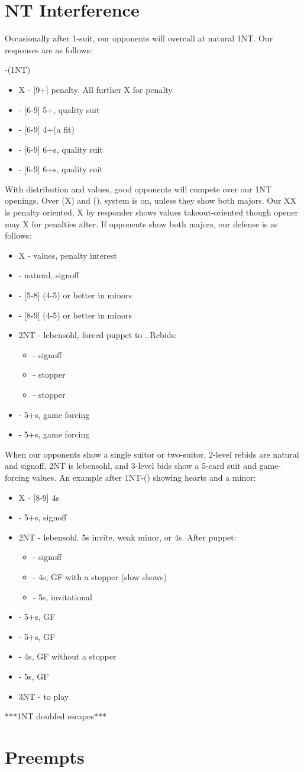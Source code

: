 \documentclass[12pt]{report}
\newcommand{\q}[1]{\multido{}{#1}{\qquad}}
\newcommand{\ul}[1]{\begin{itemize}#1\end{itemize}}
\newcommand{\li}[1]{\item[~] \q{#1}}
\begin{document}
\section{NT Interference} \label{3:4}

    Occasionally after 1-suit, our opponents will overcall at natural 1NT.  Our responses are as follows:

    -(1NT)
    \ul{
        \li0 X - [9+] penalty.  All further X for penalty
        \li0 \cl2 - [6-9] 5+\cl{}, quality suit
        \li0 \di2 - [6-9] 4+\di (a fit)
        \li0 \he2 - [6-9] 6+\he{}s, quality suit
        \li0 \sp2 - [6-9] 6+\sp{}s, quality suit
    }

    With distribution and values, good opponents will compete over our 1NT openings.  Over (X) and (), system is on, unless they show both majors.  Our XX is penalty oriented, X by responder shows values takeout-oriented though opener may X for penalties after.  If opponents show both majors, our defense is as follows:

    \ul{
        \li0 X - values, penalty interest
        \li0  - natural, signoff
        \li0 \he2 - [5-8] (4-5) or better in minors
        \li0 \sp2 - [8-9] (4-5) or better in minors
        \li0 2NT - lebensohl, forced puppet to \cl3.  Rebids: \ul{
            \li0 \di3 - signoff
            \li0 \he3 - stopper
            \li0 \sp3 - stopper
        }

        \li0 \cl3 - 5+\cl{}s, game forcing
        \li0 \di3 - 5+\di{}s, game forcing
    }

    When our opponents show a single suitor or two-suitor, 2-level rebids are natural and signoff, 2NT is lebensohl, and 3-level bids show a 5-card suit and game-forcing values.  An example after 1NT-() showing hearts and a minor:

    \ul{
        \li0 X - [8-9] 4\sp{}s
        \li0  - 5+\sp{}s, signoff
        \li0 2NT - lebensohl.  5\sp{}s invite, weak minor, or 4\sp{}s.  After \cl3 puppet: \ul{
            \li0 \di3 - signoff
            \li0 \he3 - 4\sp{}s, GF with a stopper (slow shows)
            \li0 \sp3 - 5\sp{}s, invitational
        }

        \li0 \cl3 - 5+\cl{}s, GF
        \li0 \di3 - 5+\di{}s, GF
        \li0 \he3 - 4\sp{}s, GF without a stopper
        \li0 \sp3 - 5\sp{}s, GF
        \li0 3NT - to play
    }

    ***1NT doubled escapes***

\section{Preempts} \label{3:5}
\end{document}
